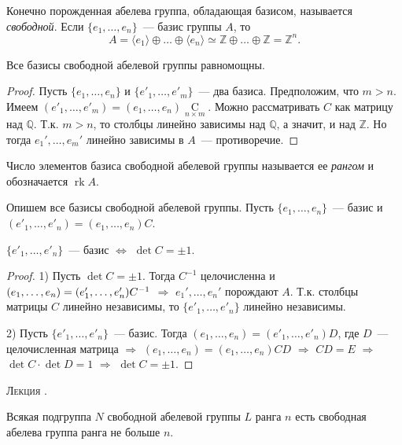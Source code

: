 \documentclass[a4paper]{article}
\newcounter{lec}
\renewcommand{\thelec}{\Roman{lec}}
\newcommand*{\lecture}[1]{\refstepcounter{lec}\vspace{20pt}
\begin{center}{\rmfamily\textsc{Лекция \thelec. \\ \textbf{#1}}}\vspace{5pt}
\end{center}}
\renewcommand{\rk}{\mathop{\mathrm{rk}}\nolimits}
\newcommand*{\p}[1]{#1\nobreak\discretionary{}{\hbox{$\mathsurround=0pt #1$}}{}}
\begin{document}
Конечно порожденная абелева группа, обладающая базисом, называется
\emph{свободной}. Если $\{e_1,\ldots,e_n\}$~--- базис группы $A$, то
$$A=\langle e_1\rangle\oplus\ldots\oplus\langle e_n\rangle\simeq
\mathbb{Z}\oplus\ldots\oplus\mathbb{Z}=\mathbb{Z}^n.$$

\begin{theorem}
Все базисы свободной абелевой группы равномощны.
\end{theorem}

\begin{proof}
Пусть $\{e_1,\ldots,e_n\}$ и $\{e'_1,\ldots,e'_m\}$~--- два базиса.
Предположим, что $m>n$. Имеем
$(e'_1,\ldots,e'_m)=(e_1,\ldots,e_n)\mathop{C}\limits_{n\times m}$.
Можно рассматривать $C$ как матрицу над $\mathbb{Q}$. Т.к. $m>n$, то
столбцы линейно зависимы над $\mathbb{Q}$, а значит, и над
$\mathbb{Z}$. Но тогда $e_1',\ldots,e_m'$ линейно зависимы в $A$~---
противоречие.
\end{proof}

Число элементов базиса свободной абелевой группы называется ее
\emph{рангом} и обозначается $\rk A$.

Опишем все базисы свободной абелевой группы. Пусть $\{e_1,\ldots,
e_n\}$~--- базис и $(e'_1,\ldots, e'_n)=(e_1,\ldots,e_n)C$.

\begin{theorem}
$\{e'_1,\ldots, e'_n\}$~--- базис $\Leftrightarrow$ $\det C=\pm1$.
\end{theorem}

\begin{proof}
1) Пусть $\det C=\pm1$. Тогда $C^{-1}$ целочисленна и
$(e_1,\p\ldots, e_n)=(e'_1,\ldots,e'_n)C^{-1}$ $\Rightarrow$
$e_1',\ldots,e_n'$ порождают $A$. Т.к. столбцы матрицы $C$ линейно
независимы, то $\{e'_1,\ldots, e'_n\}$ линейно независимы.

2) Пусть $\{e'_1,\ldots, e'_n\}$~--- базис. Тогда $(e_1,\ldots,
e_n)=(e'_1,\ldots,e'_n)D$, где $D$~--- целочисленная матрица
$\Rightarrow$ $(e_1,\ldots, e_n)=(e_1,\ldots,e_n)CD$ $\Rightarrow$
$CD=E$ $\Rightarrow$ $\det C\cdot \det D=1$ $\Rightarrow$ $\det
C=\pm1$.
\end{proof}
\lecture{}

\begin{theorem}
\label{1.IV}Всякая подгруппа $N$ свободной абелевой группы $L$ ранга
$n$ есть свободная абелева группа ранга не больше $n$.
\end{theorem}
\end{document}

